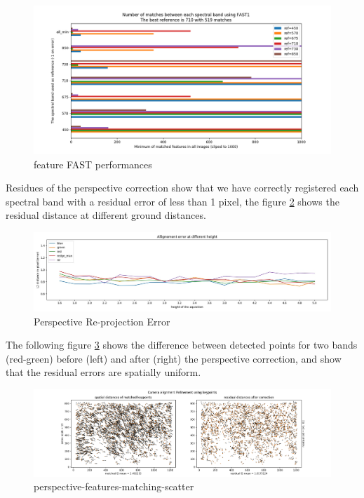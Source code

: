 \documentclass[]{elsarticle}
\begin{document}
	\begin{figure}[!htb]
		\centering
		\includegraphics[width=\linewidth]{../figures/comparaison-keypoint-matching-reference-FAST1.png}
		\caption{feature FAST performances}
		\label{fig:features-FAST-performances}
	\end{figure}
	
	Residues of the perspective correction show that we have correctly registered each spectral band with a residual error of less than 1 pixel,
	the figure \ref{fig:perspective-error} shows the residual distance at different ground distances.
	
	\begin{figure}[!htb]
		\centering
		\includegraphics[width=\linewidth]{../figures/prespective-allignement-rmse.jpg}
		\caption{Perspective Re-projection Error}
		\label{fig:perspective-error}
	\end{figure}
	
	The following figure \ref{fig:perspective-features-matching-scatter} shows the difference between detected points for two bands (red-green)
	before (left) and after (right) the perspective correction, and show that the residual errors are spatially uniform.
	
	\begin{figure}[!htb]
		\centering
		\includegraphics[width=\linewidth]{../figures/perspective-features-matching-scatter.png}
		\caption{perspective-features-matching-scatter}
		\label{fig:perspective-features-matching-scatter}
	\end{figure}
	
\end{document}
